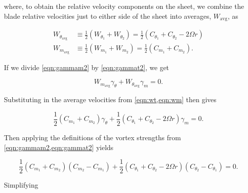 \noindent where, to obtain the relative velocity components on the sheet, we combine the blade relative velocities just to either side of the sheet into averages, \(W_\text{avg}\),  as

\begin{align}
    \label{eqn:wt}
    W_{\theta_\text{avg}} &\equiv \frac{1}{2} (W_{\theta_1} + W_{\theta_2}) = \frac{1}{2} (C_{\theta_1} + C_{\theta_2} - 2\Omega r)  \\
    \label{eqn:wm}
    W_{m_\text{avg}} &\equiv \frac{1}{2} (W_{m_1} + W_{m_2}) = \frac{1}{2} (C_{m_1} + C_{m_2}).
\end{align}


\noindent If we divide \cref{eqn:gammam2} by \cref{eqn:gammat2}, we get


\begin{equation}
    \label{eqn:wgam}
        W_{m_\text{avg}} \gamma_\theta + W_{\theta_\text{avg}} \gamma_m = 0.
\end{equation}

\noindent Substituting in the average velocities from \cref{eqn:wt,eqn:wm} then gives

\begin{equation}
    \frac{1}{2}(C_{m_1} + C_{m_2}) \gamma_\theta + \frac{1}{2} (C_{\theta_1} + C_{\theta_2} - 2\Omega r)  \gamma_m = 0.
\end{equation}

\noindent Then applying the definitions of the vortex strengths from \cref{eqn:gammam2,eqn:gammat2} yields

\begin{equation}
    \frac{1}{2}(C_{m_1} + C_{m_2}) (C_{m_2} - C_{m_1})  + \frac{1}{2} (C_{\theta_1} + C_{\theta_2} - 2\Omega r)  (C_{\theta_2} - C_{\theta_1}) = 0.
\end{equation}

\noindent Simplifying


